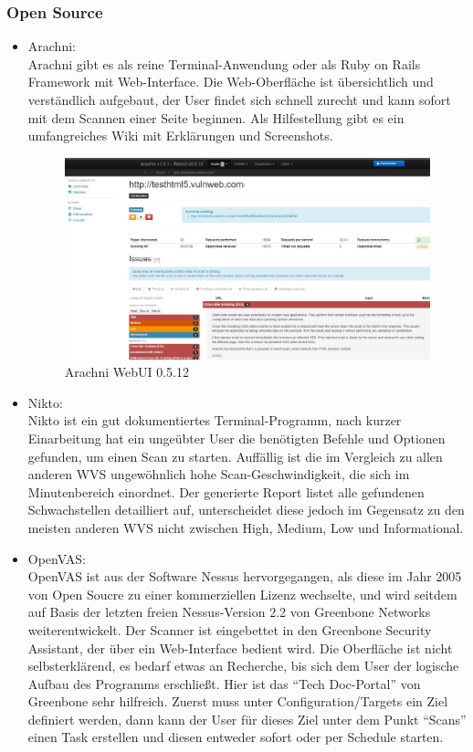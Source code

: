 \documentclass[12pt,oneside,a4paper,parskip]{scrbook}
\begin{document}
    \subsubsection{Open Source}
        \begin{itemize}
          \item Arachni:\\
            Arachni gibt es als reine Terminal-Anwendung oder als Ruby on Rails Framework mit Web-Interface. Die Web-Oberfläche ist übersichtlich und verständlich aufgebaut, der User findet sich schnell zurecht und kann sofort mit dem Scannen einer Seite beginnen. Als Hilfestellung gibt es ein umfangreiches Wiki mit Erklärungen und Screenshots.
            \begin{figure}[H]
              \includegraphics[width=1\textwidth]{Images/Arachni}
              \caption[Arachni WebUI 0.5.12]{Arachni WebUI 0.5.12}
            \end{figure}
          \item Nikto:\\
            Nikto ist ein gut dokumentiertes Terminal-Programm, nach kurzer Einarbeitung hat ein ungeübter User die benötigten Befehle und Optionen gefunden, um einen Scan zu starten.
            Auffällig ist die im Vergleich zu allen anderen WVS ungewöhnlich hohe Scan-Geschwindigkeit, die sich im Minutenbereich einordnet.
            Der generierte Report listet alle gefundenen Schwachstellen detailliert auf, unterscheidet diese jedoch im Gegensatz zu den meisten anderen WVS nicht zwischen High, Medium, Low und Informational.
          \item OpenVAS:\\
            OpenVAS ist aus der Software Nessus hervorgegangen, als diese im Jahr 2005 von Open Soucre zu einer kommerziellen Lizenz wechselte, und wird seitdem auf Basis der letzten freien Nessus-Version 2.2 von Greenbone Networks weiterentwickelt. Der Scanner ist eingebettet in den Greenbone Security Assistant, der über ein Web-Interface bedient wird. Die Oberfläche ist nicht selbsterklärend, es bedarf etwas an Recherche, bis sich dem User der logische Aufbau des Programms erschließt. Hier ist das ``Tech Doc-Portal'' von Greenbone sehr hilfreich. Zuerst muss unter Configuration/Targets ein Ziel definiert werden, dann kann der User für dieses Ziel unter dem Punkt ``Scans'' einen Task erstellen und diesen entweder sofort oder per Schedule starten.

\end{itemize}
\end{document}
